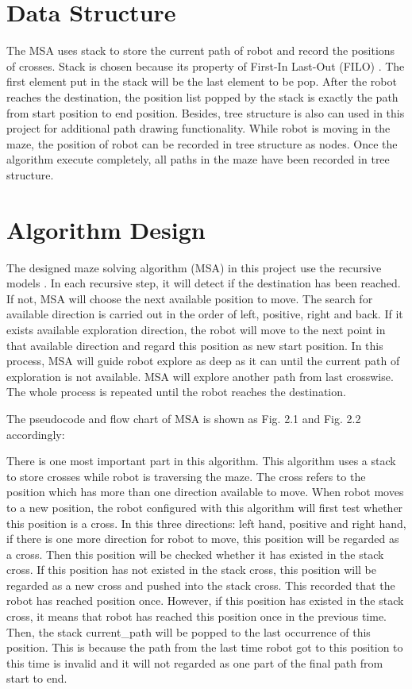 \documentclass[11pt,times,oneside,openright,hardcopy]{eeereport}
\begin{document}
\section{Data Structure}
The MSA uses stack to store the current path of robot and record the positions of crosses. Stack is chosen because its property of First-In Last-Out (FILO) \cite{Roser:2015ez}. The first element put in the stack will be the last element to be pop. After the robot reaches the destination, the position list popped by the stack is exactly the path from start position to end position. 
Besides, tree structure is also can used in this project for additional path drawing functionality. While robot is moving in the maze, the position of robot can be recorded in tree structure as nodes. Once the algorithm execute completely, all paths in the maze have been recorded in tree structure.


\section{Algorithm Design}
The designed maze solving algorithm (MSA) in this project use the recursive models \cite{Khoussainov:1995vx}. In each recursive step, it will detect if the destination has been reached. If not, MSA will choose the next available position to move. 
The search for available direction is carried out in the order of left, positive, right and back. If it exists available exploration direction, the robot will move to the next point in that available direction and regard this position as new start position.
In this process, MSA will guide robot explore as deep as it can until the current path of exploration is not available. MSA will explore another path from last crosswise. The whole process is repeated until the robot reaches the destination. 

The pseudocode and flow chart of MSA is shown as Fig. 2.1 and Fig. 2.2 accordingly:



There is one most important part in this algorithm. This algorithm uses a stack to store crosses while robot is traversing the maze.
The cross refers to the position which has more than one direction available to move. When robot moves to a new position,
the robot configured with this algorithm will first test whether this position is a cross. In this three directions: left hand, positive and right hand,
if there is one more direction for robot to move, this position will be regarded as a cross. Then this position will be checked whether it has existed in the stack cross.
If this position has not existed in the stack cross, this position will be regarded as a new cross and pushed into the stack cross. This recorded that the robot has reached position once.
However, if this position has existed in the stack cross, it means that robot has reached this position once in the previous time. 
Then, the stack current\_path will be popped to the last occurrence of this position. This is because the path from the last time robot got to this position to this time is invalid
and it will not regarded as one part of the final path from start to end.
\end{document}
